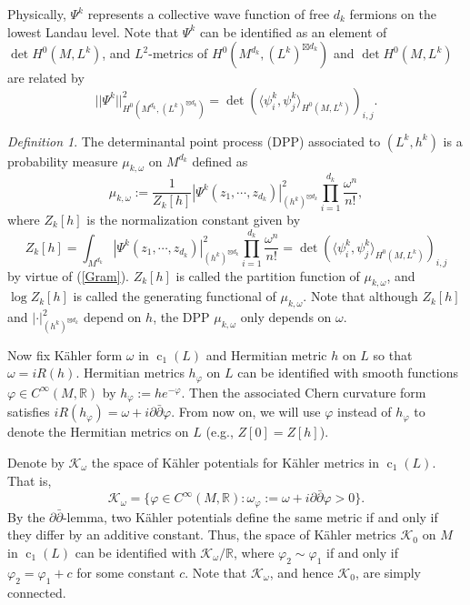 \documentclass[12pt,reqno,a4paper]{amsart}
\numberwithin{equation}{section}
\def\p{\partial}
\def\bp{\bar\partial}
\DeclareMathOperator{\cc}{c}
\theoremstyle{remark}
\theoremstyle{dotless}
\newtheorem{definition}[theo]{{\sc Definition}}
\begin{document}
Physically, $\Psi^k$ represents a collective wave function of free $d_k$ fermions on the lowest Landau level. Note that $\Psi^k$ can be identified as an element of $\det H^0(M,L^k)$, and $L^2$-metrics of $H^0(M^{d_k},(L^k)^{\boxtimes d_k})$ and $\det H^0(M,L^k)$ are related by
\begin{equation}\label{Gram}
||\Psi^k||^2_{H^0(M^{d_k},(L^k)^{\boxtimes d_k})}=\det(\langle \psi^k_i,\psi^k_j \rangle_{H^0(M,L^k)})_{i,j}.
\end{equation}
\begin{definition}
The determinantal point process (DPP) associated to $(L^k, h^k)$ is a probability measure $\mu_{k,\omega}$ on $M^{d_k}$ defined as
\begin{equation*}
\mu_{k,\omega}:=\frac{1}{Z_k[h]}|\Psi^k(z_1,\cdots,z_{d_k})|^2_{(h^k)^{\boxtimes d_k}}\prod_{i=1}^{d_k}\frac{\omega^n}{n!},
\end{equation*}
where $Z_k[h]$ is the normalization constant given by
\begin{equation*}
Z_k[h]=\int_{M^{d_k}}|\Psi^k(z_1,\cdots,z_{d_k})|^2_{(h^k)^{\boxtimes d_k}}\prod_{i=1}^{d_k}\frac{\omega^n}{n!} = \det(\langle \psi^k_i,\psi^k_j \rangle_{H^0(M,L^k)})_{i,j}
\end{equation*}
by virtue of (\ref{Gram}). $Z_k[h]$ is called the partition function of $\mu_{k,\omega}$, and $\log Z_k[h]$ is called the generating functional of $\mu_{k,\omega}$. Note that although $Z_k[h]$ and $|\cdot|^2_{(h^k)^{\boxtimes d_k}}$ depend on $h$, the DPP $\mu_{k,\omega}$ only depends on $\omega$.
\end{definition}

Now fix K\"ahler form $\omega$ in $\cc_1(L)$ and Hermitian metric $h$ on $L$ so that $\omega=iR(h)$. Hermitian metrics $h_\varphi$ on $L$ can be identified with smooth functions $\varphi\in C^\infty(M,\mathbb{R})$ by $h_\varphi:=he^{-\varphi}$. Then the associated Chern curvature form satisfies $iR(h_\varphi)=\omega+i\p\bp\varphi$. From now on, we will use $\varphi$ instead of $h_\varphi$ to denote the Hermitian metrics on $L$ (e.g., $Z[0]=Z[h]$).

Denote by $\mathcal{K}_{\omega}$ the space of K\"ahler potentials for K\"ahler metrics in $\cc_1(L)$. That is,
\begin{equation*}
\mathcal{K}_{\omega}=\{ \varphi\in C^{\infty}(M,\mathbb{R}) : \omega_{\varphi}:=\omega+i\p\bp\varphi>0 \}.
\end{equation*}
By the $\p\bp$-lemma, two K\"ahler potentials define the same metric if and only if they differ by an additive constant. Thus, the space of K\"ahler metrics $\mathcal{K}_0$ on $M$ in $\cc_1(L)$ can be identified with $\mathcal{K}_\omega/\mathbb{R}$, where $\varphi_2\sim\varphi_1$ if and only if $\varphi_2=\varphi_1+c$ for some constant $c$. Note that $\mathcal{K}_{\omega}$, and hence $\mathcal{K}_{0}$, are simply connected.
\end{document}
